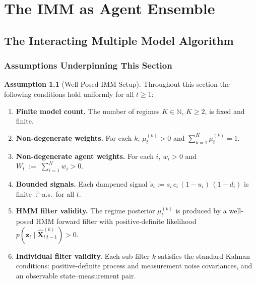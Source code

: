 \documentclass[12pt,openany]{book}
\numberwithin{equation}{chapter}
\theoremstyle{plain}
\theoremstyle{definition}
\newtheorem{assumption}[theorem]{Assumption}
\theoremstyle{remark}
\begin{document}
\chapter{The IMM as Agent Ensemble}
\label{ch:imm}

\section{The Interacting Multiple Model Algorithm}

\subsection*{Assumptions Underpinning This Section}

\begin{assumption}[Well-Posed IMM Setup]
\label{asm:imm-wellposed}
Throughout this section the following conditions hold uniformly
for all $t \geq 1$:
\begin{enumerate}
  \item \textbf{Finite model count.}  The number of regimes
        $K \in \mathbb{N}$, $K \geq 2$, is fixed and finite.
  \item \textbf{Non-degenerate weights.}  For each $k$,
        $\mu_t^{(k)} > 0$ and $\sum_{k=1}^{K} \mu_t^{(k)} = 1$.
  \item \textbf{Non-degenerate agent weights.}  For each $i$,
        $w_i > 0$ and $W_t \;:=\; \sum_{i=1}^{N} w_i > 0$.
  \item \textbf{Bounded signals.}  Each dampened signal
        $\tilde{s}_i := s_i\,c_i\,(1-u_i)\,(1-d_i)$ is
        finite~$\mathbb{P}$-a.s.\ for all $t$.
  \item \textbf{HMM filter validity.}  The regime posterior
        $\mu_t^{(k)}$ is produced by a well-posed HMM forward
        filter with positive-definite likelihood
        $p(\mathbf{z}_t \mid \hat{\mathbf{X}}_{t|t-1}^{(k)}) > 0$.
  \item \textbf{Individual filter validity.}  Each sub-filter
        $k$ satisfies the standard Kalman conditions:
        positive-definite process and measurement noise
        covariances, and an observable state--measurement pair.
\end{enumerate}
\end{assumption}
\end{document}
